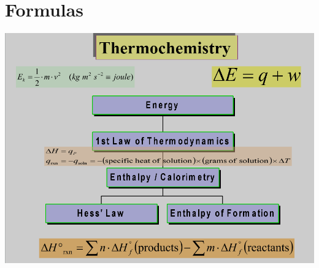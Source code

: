 \documentclass[11pt]{article}
\begin{document}
\pagebreak




\section{Formulas}
\includegraphics[scale=0.7]{ther1}
\end{document}
